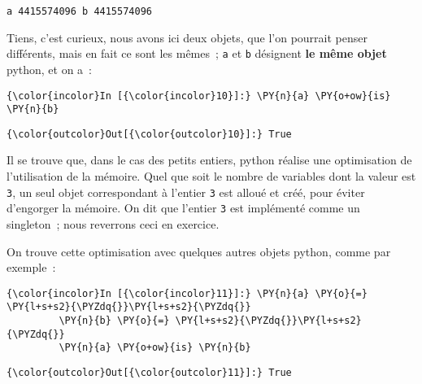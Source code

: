     \begin{Verbatim}[commandchars=\\\{\},frame=single,framerule=0.3mm,rulecolor=\color{cellframecolor}]
a 4415574096 b 4415574096
\end{Verbatim}

    Tiens, c'est curieux, nous avons ici deux objets, que l'on pourrait
penser différents, mais en fait ce sont les mêmes~; \texttt{a} et
\texttt{b} désignent \textbf{le même objet} python, et on a~:

    \begin{Verbatim}[commandchars=\\\{\},frame=single,framerule=0.3mm,rulecolor=\color{cellframecolor}]
{\color{incolor}In [{\color{incolor}10}]:} \PY{n}{a} \PY{o+ow}{is} \PY{n}{b}
\end{Verbatim}


\begin{Verbatim}[commandchars=\\\{\},frame=single,framerule=0.3mm,rulecolor=\color{cellframecolor}]
{\color{outcolor}Out[{\color{outcolor}10}]:} True
\end{Verbatim}
            
    Il se trouve que, dans le cas des petits entiers, python réalise une
optimisation de l'utilisation de la mémoire. Quel que soit le nombre de
variables dont la valeur est \texttt{3}, un seul objet correspondant à
l'entier \texttt{3} est alloué et créé, pour éviter d'engorger la
mémoire. On dit que l'entier \texttt{3} est implémenté comme un
singleton~; nous reverrons ceci en exercice.

    On trouve cette optimisation avec quelques autres objets python, comme
par exemple~:

    \begin{Verbatim}[commandchars=\\\{\},frame=single,framerule=0.3mm,rulecolor=\color{cellframecolor}]
{\color{incolor}In [{\color{incolor}11}]:} \PY{n}{a} \PY{o}{=} \PY{l+s+s2}{\PYZdq{}}\PY{l+s+s2}{\PYZdq{}}
         \PY{n}{b} \PY{o}{=} \PY{l+s+s2}{\PYZdq{}}\PY{l+s+s2}{\PYZdq{}}
         \PY{n}{a} \PY{o+ow}{is} \PY{n}{b}
\end{Verbatim}


\begin{Verbatim}[commandchars=\\\{\},frame=single,framerule=0.3mm,rulecolor=\color{cellframecolor}]
{\color{outcolor}Out[{\color{outcolor}11}]:} True
\end{Verbatim}
            
